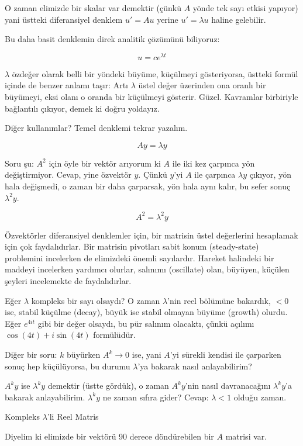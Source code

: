 \documentclass[12pt,fleqn]{article}\usepackage{../../common}
\begin{document}
O zaman elimizde bir skalar var demektir (çünkü $A$ yönde tek sayı etkisi
yapıyor) yani üstteki diferansiyel denklem $u' = Au$ yerine $u' = \lambda
u$ haline gelebilir.

Bu daha basit denklemin direk analitik çözümünü biliyoruz:

$$ u = ce^{\lambda t} $$

$\lambda$ özdeğer olarak belli bir yöndeki büyüme, küçülmeyi gösteriyorsa,
üstteki formül içinde de benzer anlamı taşır: Artı $\lambda$ üstel değer
üzerinden ona oranlı bir büyümeyi, eksi olanı o oranda bir küçülmeyi
gösterir. Güzel. Kavramlar birbiriyle bağlantılı çıkıyor, demek ki doğru
yoldayız.

Diğer kullanımlar? Temel denklemi tekrar yazalım. 

$$ Ay = \lambda y $$

Soru şu: $A^2$ için öyle bir vektör arıyorum ki $A$ ile iki kez çarpınca
yön değiştirmiyor. Cevap, yine özvektör $y$. Çünkü $y$'yi $A$ ile çarpınca
$\lambda y$ çıkıyor, yön hala değişmedi, o zaman bir daha çarparsak, yön
hala aynı kalır, bu sefer sonuç $\lambda^2y$.

$$ A^2 = \lambda^2 y $$

Özvektörler diferansiyel denklemler için, bir matrisin üstel değerlerini
hesaplamak için çok faydalıdırlar. Bir matrisin pivotları sabit konum
(steady-state) problemini incelerken de elimizdeki önemli
sayılardır. Hareket halindeki bir maddeyi incelerken yardımcı olurlar,
salınımı (oscillate) olan, büyüyen, küçülen şeyleri incelemekte de
faydalıdırlar.

Eğer $\lambda$ kompleks bir sayı olsaydı? O zaman $\lambda$'nin reel
bölümüne bakardık, $< 0$ ise, stabil küçülme (decay), büyük ise stabil
olmayan büyüme (growth) olurdu. Eğer $e^{4it}$ gibi bir değer olsaydı, bu
pür salınım olacaktı, çünkü açılımı $\cos(4t) + i\sin(4t)$ formülüdür.

Diğer bir soru: $k$ büyürken $A^k \to 0$ ise, yani $A$'yi sürekli kendisi
ile çarparken sonuç hep küçülüyorsa, bu durumu $\lambda$'ya bakarak nasıl
anlayabilirim? 

$A^ky$ ise $\lambda^ky$ demektir (üstte gördük), o zaman $A^ky$'nin nasıl
davranacağını $\lambda^ky$'a bakarak anlayabilirim. $\lambda^ky$ ne zaman
sıfıra gider? Cevap: $\lambda < 1$ olduğu zaman.

Kompleks $\lambda$'li Reel Matris

Diyelim ki elimizde bir vektörü 90 derece döndürebilen bir $A$ matrisi
var. 
\end{document}

